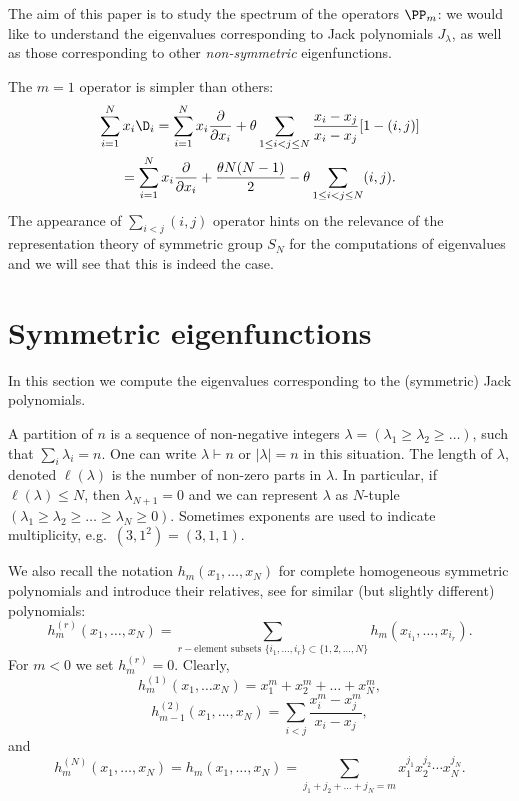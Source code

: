 The aim of this paper is to study the spectrum of the operators $\PP_m$: we would like to understand the eigenvalues corresponding to Jack polynomials $J_\lambda$, as well as those corresponding to other \emph{non-symmetric} eigenfunctions.

The $m=1$ operator is simpler than others:
\begin{multline*}
 \sum_{i=1}^N x_i \D_i = \sum_{i=1}^N x_i \frac{\partial}{\partial x_i}+\theta \sum_{1\le i<j\le N} \frac{x_i-x_j}{x_i-x_j} [1-(i,j)]\\=
  \sum_{i=1}^N x_i \frac{\partial}{\partial x_i} + \frac{ \theta N(N-1)}{2} - \theta \sum_{1\le i <j\le N} (i,j).
\end{multline*}
The appearance of $\sum_{i<j} (i,j)$ operator hints on the relevance of the representation theory of symmetric group $S_N$ for the computations of eigenvalues and we will see that this is indeed the case.


\section{Symmetric eigenfunctions}
\label{Section_sym_eigenfunction}

In this section we compute the eigenvalues corresponding to the (symmetric) Jack polynomials.

A partition of $n$ is a sequence of non-negative integers $\lambda=(\lambda_1\ge \lambda_2\ge \dots)$, such that $\sum_{i} \lambda_i=n$. One can write $\lambda\vdash n$ or $|\lambda|=n$ in this situation. The length of $\lambda$, denoted $\ell(\lambda)$ is the number of non-zero parts in $\lambda$. In particular, if $\ell(\lambda)\le N$, then $\lambda_{N+1}=0$ and we can represent $\lambda$ as $N$-tuple $(\lambda_1\ge\lambda_2\ge \dots\ge\lambda_N\ge 0)$. Sometimes exponents are used to indicate multiplicity, e.g.\ $(3,1^2)=(3,1,1)$.

We also recall the notation $h_m(x_1,\dots,x_N)$ for complete homogeneous symmetric polynomials and introduce their relatives, see \cite[Example 19, Section I.2]{macdonald1998symmetric} for similar (but slightly different) polynomials:
\begin{equation}
\label{eq_x3}
 h^{(r)}_m(x_1,\dots,x_N)=\sum_{r-\text{element subsets }\{i_1,\dots,i_r\}\subset\{1,2,\dots,N\}}h_m(x_{i_1},\dots,x_{i_r}).
\end{equation}
For $m<0$ we set $h^{(r)}_m=0$.
Clearly,
$$h^{(1)}_m(x_1,\dots x_N)=x_1^m+x_2^m+\dots+x_N^m,$$
$$h^{(2)}_{m-1}(x_1,\dots,x_N)=\sum_{i<j} \frac{x_i^{m}-x_j^m}{x_i-x_j},$$
and
$$
 h^{(N)}_m(x_1,\dots,x_N)=h_m(x_1,\dots,x_N)=\sum_{j_1+j_2+\dots+j_N=m} x_1^{j_1} x_2^{j_2}\cdots x_N^{j_N}.
$$


